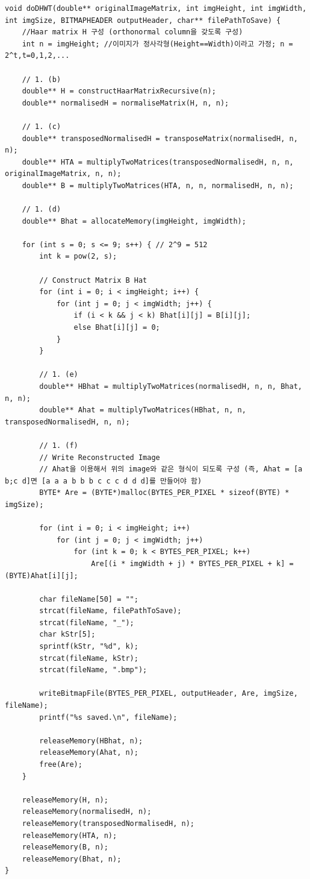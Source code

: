 \begin{verbatim}
void doDHWT(double** originalImageMatrix, int imgHeight, int imgWidth, int imgSize, BITMAPHEADER outputHeader, char** filePathToSave) {
    //Haar matrix H 구성 (orthonormal column을 갖도록 구성)
    int n = imgHeight; //이미지가 정사각형(Height==Width)이라고 가정; n = 2^t,t=0,1,2,...

    // 1. (b)
    double** H = constructHaarMatrixRecursive(n);
    double** normalisedH = normaliseMatrix(H, n, n);

    // 1. (c)
    double** transposedNormalisedH = transposeMatrix(normalisedH, n, n);
    double** HTA = multiplyTwoMatrices(transposedNormalisedH, n, n, originalImageMatrix, n, n);
    double** B = multiplyTwoMatrices(HTA, n, n, normalisedH, n, n);

    // 1. (d)
    double** Bhat = allocateMemory(imgHeight, imgWidth);

    for (int s = 0; s <= 9; s++) { // 2^9 = 512
        int k = pow(2, s);

        // Construct Matrix B Hat
        for (int i = 0; i < imgHeight; i++) {
            for (int j = 0; j < imgWidth; j++) {
                if (i < k && j < k) Bhat[i][j] = B[i][j];
                else Bhat[i][j] = 0;
            }
        }

        // 1. (e)
        double** HBhat = multiplyTwoMatrices(normalisedH, n, n, Bhat, n, n);
        double** Ahat = multiplyTwoMatrices(HBhat, n, n, transposedNormalisedH, n, n);

        // 1. (f)
        // Write Reconstructed Image
        // Ahat을 이용해서 위의 image와 같은 형식이 되도록 구성 (즉, Ahat = [a b;c d]면 [a a a b b b c c c d d d]를 만들어야 함)
        BYTE* Are = (BYTE*)malloc(BYTES_PER_PIXEL * sizeof(BYTE) * imgSize);

        for (int i = 0; i < imgHeight; i++)
            for (int j = 0; j < imgWidth; j++)
                for (int k = 0; k < BYTES_PER_PIXEL; k++)
                    Are[(i * imgWidth + j) * BYTES_PER_PIXEL + k] = (BYTE)Ahat[i][j];

        char fileName[50] = "";
        strcat(fileName, filePathToSave);
        strcat(fileName, "_");
        char kStr[5];
        sprintf(kStr, "%d", k);
        strcat(fileName, kStr);
        strcat(fileName, ".bmp");

        writeBitmapFile(BYTES_PER_PIXEL, outputHeader, Are, imgSize, fileName);
        printf("%s saved.\n", fileName);

        releaseMemory(HBhat, n);
        releaseMemory(Ahat, n);
        free(Are);
    }

    releaseMemory(H, n);
    releaseMemory(normalisedH, n);
    releaseMemory(transposedNormalisedH, n);
    releaseMemory(HTA, n);
    releaseMemory(B, n);
    releaseMemory(Bhat, n);
}
\end{verbatim}

